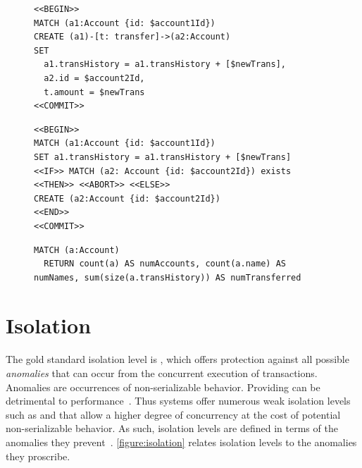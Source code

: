 \begin{figure}[htb]
  \centering
  \begin{minipage}{0.45\linewidth}
    \begin{lstlisting}[language=cypher,label=fig:ac,caption=\tx{Atomicity-C Tx.}]
<<BEGIN>>
MATCH (a1:Account {id: $account1Id})
CREATE (a1)-[t: transfer]->(a2:Account)
SET
  a1.transHistory = a1.transHistory + [$newTrans],
  a2.id = $account2Id,
  t.amount = $newTrans
<<COMMIT>>
\end{lstlisting}
  \end{minipage}
  \quad
  \begin{minipage}{0.52\linewidth}
    \begin{lstlisting}[language=cypher,label=fig:arb,caption=\tx{Atomicity-RB Tx.}]
<<BEGIN>>
MATCH (a1:Account {id: $account1Id})
SET a1.transHistory = a1.transHistory + [$newTrans]
<<IF>> MATCH (a2: Account {id: $account2Id}) exists
<<THEN>> <<ABORT>> <<ELSE>>
CREATE (a2:Account {id: $account2Id})
<<END>>
<<COMMIT>>
\end{lstlisting}
  \end{minipage}
\end{figure}


\begin{figure}[htb]
  \centering
  \begin{lstlisting}[language=cypher,label=fig:acheck,caption=\tx{Atomicity-C/Atomicity-RB:} counting entities in the graph.]
  MATCH (a:Account)
  RETURN count(a) AS numAccounts, count(a.name) AS numNames, sum(size(a.transHistory)) AS numTransferred
\end{lstlisting}
\end{figure}

\section{Isolation}
\label{sec:isolation}

The gold standard isolation level is , which offers
protection against all possible \emph{anomalies} that can occur from the
concurrent execution of transactions. Anomalies are occurrences of
non-serializable behavior. Providing  can be detrimental
to performance~\cite{DBLP:conf/ds/GrayLPT76}. Thus systems offer numerous weak
isolation levels such as  and 
that allow a higher degree of concurrency at the cost of potential
non-serializable behavior. As such, isolation levels are defined in terms of
the anomalies they prevent~\cite{DBLP:conf/ds/GrayLPT76,DBLP:journals/pvldb/BailisDFGHS13}.
\autoref{figure:isolation} relates isolation levels to the anomalies they proscribe.

